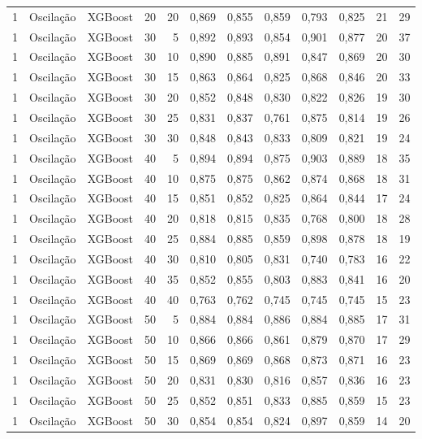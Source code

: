 \begin{longtable}{ccclrrrrrrrr}
1 & Oscilação & XGBoost & 20 & 20 & 0,869 & 0,855 & 0,859 & 0,793 & 0,825 & 21 & 29 \\
1 & Oscilação & XGBoost & 30 & 5 & 0,892 & 0,893 & 0,854 & 0,901 & 0,877 & 20 & 37 \\
1 & Oscilação & XGBoost & 30 & 10 & 0,890 & 0,885 & 0,891 & 0,847 & 0,869 & 20 & 30 \\
1 & Oscilação & XGBoost & 30 & 15 & 0,863 & 0,864 & 0,825 & 0,868 & 0,846 & 20 & 33 \\
1 & Oscilação & XGBoost & 30 & 20 & 0,852 & 0,848 & 0,830 & 0,822 & 0,826 & 19 & 30 \\
1 & Oscilação & XGBoost & 30 & 25 & 0,831 & 0,837 & 0,761 & 0,875 & 0,814 & 19 & 26 \\
1 & Oscilação & XGBoost & 30 & 30 & 0,848 & 0,843 & 0,833 & 0,809 & 0,821 & 19 & 24 \\
1 & Oscilação & XGBoost & 40 & 5 & 0,894 & 0,894 & 0,875 & 0,903 & 0,889 & 18 & 35 \\
1 & Oscilação & XGBoost & 40 & 10 & 0,875 & 0,875 & 0,862 & 0,874 & 0,868 & 18 & 31 \\
1 & Oscilação & XGBoost & 40 & 15 & 0,851 & 0,852 & 0,825 & 0,864 & 0,844 & 17 & 24 \\
1 & Oscilação & XGBoost & 40 & 20 & 0,818 & 0,815 & 0,835 & 0,768 & 0,800 & 18 & 28 \\
1 & Oscilação & XGBoost & 40 & 25 & 0,884 & 0,885 & 0,859 & 0,898 & 0,878 & 18 & 19 \\
1 & Oscilação & XGBoost & 40 & 30 & 0,810 & 0,805 & 0,831 & 0,740 & 0,783 & 16 & 22 \\
1 & Oscilação & XGBoost & 40 & 35 & 0,852 & 0,855 & 0,803 & 0,883 & 0,841 & 16 & 20 \\
1 & Oscilação & XGBoost & 40 & 40 & 0,763 & 0,762 & 0,745 & 0,745 & 0,745 & 15 & 23 \\
1 & Oscilação & XGBoost & 50 & 5 & 0,884 & 0,884 & 0,886 & 0,884 & 0,885 & 17 & 31 \\
1 & Oscilação & XGBoost & 50 & 10 & 0,866 & 0,866 & 0,861 & 0,879 & 0,870 & 17 & 29 \\
1 & Oscilação & XGBoost & 50 & 15 & 0,869 & 0,869 & 0,868 & 0,873 & 0,871 & 16 & 23 \\
1 & Oscilação & XGBoost & 50 & 20 & 0,831 & 0,830 & 0,816 & 0,857 & 0,836 & 16 & 23 \\
1 & Oscilação & XGBoost & 50 & 25 & 0,852 & 0,851 & 0,833 & 0,885 & 0,859 & 15 & 23 \\
1 & Oscilação & XGBoost & 50 & 30 & 0,854 & 0,854 & 0,824 & 0,897 & 0,859 & 14 & 20 \\

\end{longtable}
